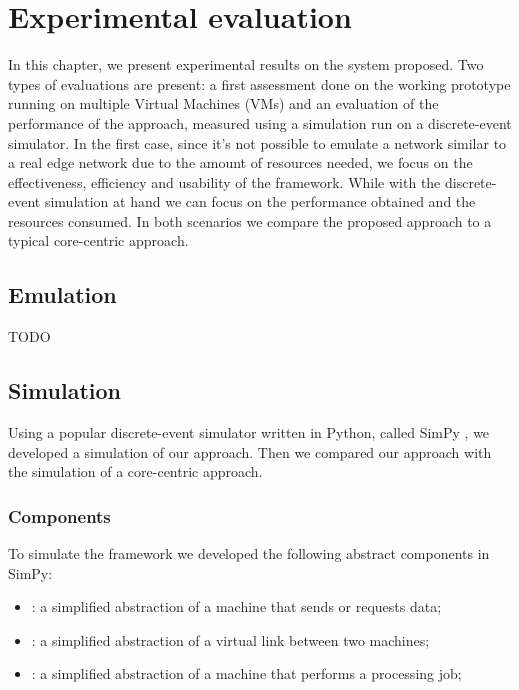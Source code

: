 \chapter{Experimental evaluation}
\label{ch:evaluation}

In this chapter, we present experimental results on the system proposed. Two types of evaluations are present: a first assessment done on the working prototype running on multiple Virtual Machines (VMs) and an evaluation of the performance of the approach, measured using a simulation run on a discrete-event simulator.
In the first case, since it's not possible to emulate a network similar to a real edge network due to the amount of resources needed, we focus on the effectiveness, efficiency and usability of the framework.
While with the discrete-event simulation at hand we can focus on the performance obtained and the resources consumed.
In both scenarios we compare the proposed approach to a typical core-centric approach.



\section{Emulation}
TODO



\section{Simulation}
Using a popular discrete-event simulator written in Python, called SimPy \cite{simpy}, we developed a simulation of our approach. Then we compared our approach with the simulation of a core-centric approach.


\subsection{Components}
To simulate the framework we developed the following abstract components in SimPy:
\begin{itemize}
    \item {}: a simplified abstraction of a machine that sends or requests data;
    \item {}: a simplified abstraction of a virtual link between two machines;
    \item {}: a simplified abstraction of a machine that performs a processing job;
\end{itemize}


